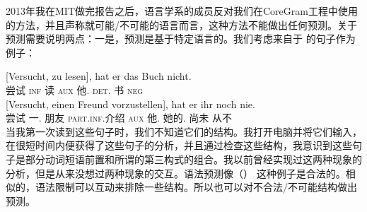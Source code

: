 2013年我在MIT做完报告之后，语言学系的成员反对我们在CoreGram工程中使用的方法，并且声称就可能/不可能的语言而言，这种方法不能做出任何预测。关于预测需要说明两点：一是，预测是基于特定语言的。我们考虑来自于 \citet{Netter91}的句子作为例子：

\eal
\ex 
\gll {}[Versucht, zu lesen], hat er das Buch nicht.\\
       \spacebr{}尝试 \textsc{inf} 读 \textsc{aux} 他.\nom{} \textsc{det}.\acc{} 书 \textsc{neg}\\
\ex 
\gll {}[Versucht, einen Freund vorzustellen], hat er ihr noch nie.\\
       \spacebr{}尝试 一.\acc{} 朋友 \textsc{part}.\textsc{inf}.介绍 \textsc{aux} 他.\nom{} 她的.\dat{} 尚未 从不\\
\zl
当我第一次读到这些句子时，我们不知道它们的结构。我打开电脑并将它们输入，在很短时间内便获得了这些句子的分析，并且通过检查这些结构，我意识到这些句子是部分动词短语前置和所谓的第三构式的组合\citep[]{Mueller99a}。我以前曾经实现过这两种现象的分析，但是从来没想过两种现象的交互。语法预测像（） 这种例子是合法的。相似的，语法限制可以互动来排除一些结构。所以也可以对不合法/不可能结构做出预测。

